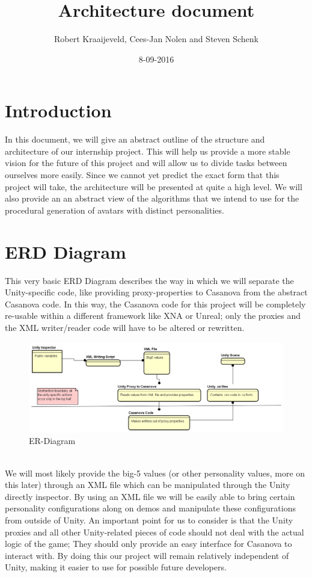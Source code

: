 \documentclass{article}
\title{Architecture document}
\date{8-09-2016}
\author{Robert Kraaijeveld, Cees-Jan Nolen and Steven Schenk}
\begin{document}
  \maketitle
  \newpage
  \tableofcontents

  \newpage
  \section{Introduction}
  In this document, we will give an abstract outline of the structure and architecture of our internship project. 
  This will help us provide a more stable vision for the future of this project and will allow us to divide tasks between ourselves more easily.
  Since we cannot yet predict the exact form that this project will take, the architecture will be presented at quite a high level. We will also
  provide an an abstract view of the algorithms that we intend to use for the procedural generation of avatars with distinct personalities.


  \newpage
  \section{ERD Diagram}
  This very basic ERD Diagram describes the way in which we will separate the Unity-specific code, like providing proxy-properties to Casanova from the abstract Casanova code. In this way, the Casanova code for this project will be completely re-usable within a different framework like XNA or Unreal; only the proxies and the XML writer/reader code will have to be altered or rewritten.

  \begin{figure}[h]
	\includegraphics[width=1.4\textwidth]{ER.png}
	\caption{ER-Diagram}
	\label{fig:figure2}
  \end{figure}

  ~\\
  We will most likely provide the big-5 values (or other personality values, more on this later) through an XML file which can be manipulated through the Unity directly inspector. By using an XML file we will be easily able to bring certain personality configurations along on demos and manipulate these configurations from outside of Unity. An important point for us to consider is that the Unity proxies and all other Unity-related pieces of code should not deal with the actual logic of the game; They should only provide an easy interface for Casanova to interact with. By doing this our project will remain relatively independent of Unity, making it easier to use for possible future developers.
\end{document}
